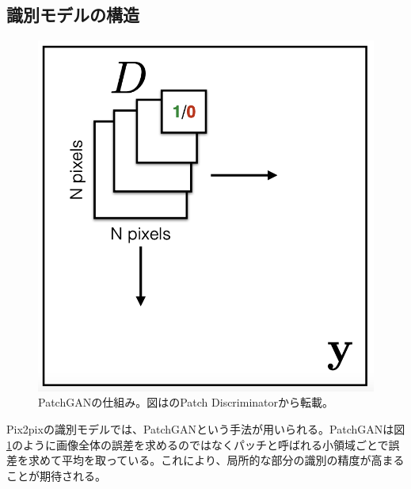 \subsection{識別モデルの構造}

\begin{figure}[t]
\begin{center}
\includegraphics[width=0.5\hsize]{figure/patchgan.png}
\caption[The LOF caption]{PatchGANの仕組み。図は\cite{slides_on_ABC}のPatch Discriminatorから転載。}
\label{fig:patchgan}
\end{center}
\end{figure}

Pix2pixの識別モデルでは、PatchGANという手法が用いられる。PatchGANは図\ref{fig:patchgan}のように画像全体の誤差を求めるのではなくパッチと呼ばれる小領域ごとで誤差を求めて平均を取っている。これにより、局所的な部分の識別の精度が高まることが期待される。

